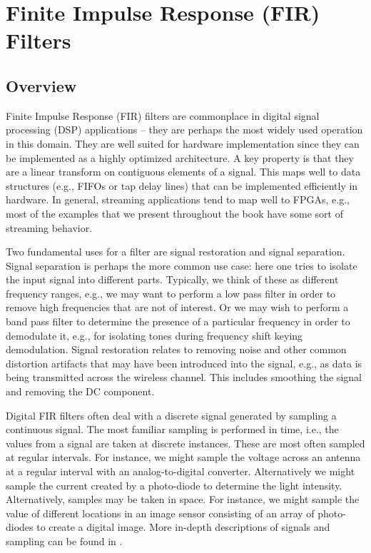
\chapter{Finite Impulse Response (FIR) Filters}
\glsresetall
\label{chapter:fir}

\section{Overview}
Finite Impulse Response (FIR) filters are commonplace in digital signal processing (DSP) applications -- they are perhaps the most widely used operation in this domain. They are well suited for hardware implementation since they can be implemented as a highly optimized architecture. A key property is that they are a linear transform on contiguous elements of a signal. This maps well to data structures (e.g., FIFOs or tap delay lines) that can be implemented efficiently in hardware. In general, streaming applications tend to map well to FPGAs, e.g., most of the examples that we present throughout the book have some sort of streaming behavior. 

Two fundamental uses for a filter are signal restoration and signal separation. Signal separation is perhaps the more common use case: here one tries to isolate the input signal into different parts. Typically, we think of these as different frequency ranges, e.g., we may want to perform a low pass filter in order to remove high frequencies that are not of interest. Or we may wish to perform a band pass filter to determine the presence of a particular frequency in order to demodulate it, e.g., for isolating tones during frequency shift keying demodulation.  Signal restoration relates to removing noise and other common distortion artifacts that may have been introduced into the signal, e.g., as data is being transmitted across the wireless channel. This includes smoothing the signal and removing the DC component.

Digital FIR filters often deal with a discrete signal generated by sampling a continuous signal. The most familiar sampling is performed in time, i.e., the values from a signal are taken at discrete instances. These are most often sampled at regular intervals. For instance, we might sample the voltage across an antenna at a regular interval with an analog-to-digital converter. Alternatively we might sample the current created by a photo-diode to determine the light intensity.  Alternatively, samples may be taken in space.  For instance, we might sample the value of different locations in an image sensor consisting of an array of photo-diodes to create a digital image.  More in-depth descriptions of signals and sampling can be found in \cite{lee2011signalsandsystems}.


